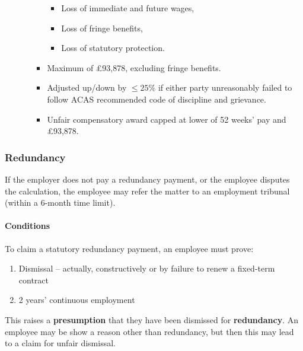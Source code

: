 \documentclass[
]{article}
\providecommand{\tightlist}{%
  \setlength{\itemsep}{0pt}\setlength{\parskip}{0pt}}
\begin{document}
\begin{itemize}
\begin{itemize}
\begin{itemize}
      \begin{itemize}
      \tightlist
      \item
        Loss of immediate and future wages,
      \item
        Loss of fringe benefits,
      \item
        Loss of statutory protection.
      \end{itemize}
    \item
      Maximum of £93,878, excluding fringe benefits.
    \item
      Adjusted up/down by {\(\leq 25\%\)} if either party unreasonably
      failed to follow ACAS recommended code of discipline and
      grievance.
    \item
      Unfair compensatory award capped at lower of 52 weeks' pay and
      £93,878.
    \end{itemize}
  \end{itemize}
\end{itemize}

\hypertarget{redundancy}{%
\subsubsection{Redundancy}\label{redundancy}}

If the employer does not pay a redundancy payment, or the employee
disputes the calculation, the employee may refer the matter to an
employment tribunal (within a 6-month time limit).

\hypertarget{conditions}{%
\paragraph{Conditions}\label{conditions}}

To claim a statutory redundancy payment, an employee must prove:

\begin{enumerate}
\tightlist
\item
  Dismissal -- actually, constructively or by failure to renew a
  fixed-term contract
\item
  2 years' continuous employment
\end{enumerate}

This raises a \textbf{presumption} that they have been dismissed for
\textbf{redundancy}. An employee may be show a reason other than
redundancy, but then this may lead to a claim for unfair dismissal.
\end{document}
